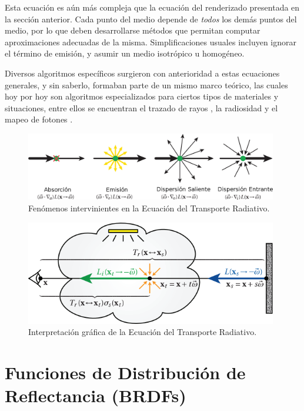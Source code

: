 Esta ecuación es aún más compleja que la ecuación del renderizado presentada en la sección anterior.
Cada punto del medio depende de {\em todos} los demás puntos del medio, por lo que deben desarrollarse métodos que permitan computar aproximaciones adecuadas de la misma.
Simplificaciones usuales incluyen ignorar el término de emisión, y asumir un medio isotrópico u homogéneo.

Diversos algoritmos específicos surgieron con anterioridad a estas ecuaciones generales, y sin saberlo, formaban parte de un mismo marco teórico, las cuales hoy por hoy son algoritmos especializados para ciertos tipos de materiales y situaciones, entre ellos se encuentran el trazado de rayos \cite{}, la radiosidad \cite{} y el mapeo de fotones \cite{}.



\begin{figure}
\center
\includegraphics[width=11cm]{figures/fenomenosrte}
\caption{Fenómenos intervinientes en la Ecuación del Transporte Radiativo.}
\label{fg:fenomenosrte}
\end{figure}

\begin{figure}
\center
\includegraphics[width=11cm]{figures/rte}
\caption{Interpretación gráfica de la Ecuación del Transporte Radiativo.}
\label{fg:rte}
\end{figure}


\section{Funciones de Distribución de Reflectancia (BRDFs)}
